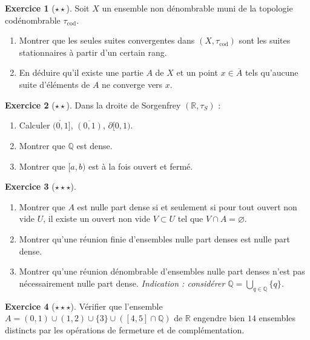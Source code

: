 \documentclass[12pt,a4paper,openany]{book}
\theoremstyle{definition}
\theoremstyle{cours}
\theoremstyle{coursnormal}
\newtheorem{exercice}{Exercice}[chapter]
\newcommand{\Q}{\mathbb{Q}}
\newcommand{\R}{\mathbb{R}}
\newcommand{\Int}[1]{\mathring{#1}}
\newcommand{\Cl}[1]{\overline{#1}}
\newcommand{\Fr}[1]{\partial #1}
\begin{document}
\begin{exercice}[$\star\star$]\label{exo:adherence-non-sequentielle}
  Soit $X$ un ensemble non dénombrable muni de la topologie codénombrable $\tau_{\mathrm{cod}}$.
  \begin{enumerate}[label=(\alph*)]
    \item Montrer que les seules suites convergentes dans $(X, \tau_{\mathrm{cod}})$ sont les suites stationnaires à partir d'un certain rang.
    \item En déduire qu'il existe une partie $A$ de $X$ et un point $x \in \Cl{A}$ tels qu'aucune suite d'éléments de $A$ ne converge vers $x$.
  \end{enumerate}
\end{exercice}

\begin{exercice}[$\star\star$]\label{exo:sorgenfrey-calculs}
  Dans la droite de Sorgenfrey $(\R, \tau_S)$ :
  \begin{enumerate}[label=(\alph*)]
    \item Calculer $\Int{(0,1]}$, $\Cl{(0,1)}$, $\Fr{[0,1)}$.
    \item Montrer que $\Q$ est dense.
    \item Montrer que $[a,b)$ est à la fois ouvert et fermé.
  \end{enumerate}
\end{exercice}

\begin{exercice}[$\star\star\star$]\label{exo:nulle-part-dense}
  \begin{enumerate}[label=(\alph*)]
    \item Montrer que $A$ est nulle part dense si et seulement si pour tout ouvert non vide $U$, il existe un ouvert non vide $V \subset U$ tel que $V \cap A = \varnothing$.
    \item Montrer qu'une réunion finie d'ensembles nulle part denses est nulle part dense.
    \item Montrer qu'une réunion dénombrable d'ensembles nulle part denses n'est pas nécessairement nulle part dense. \emph{Indication : considérer $\Q = \bigcup_{q \in \Q} \{q\}$.}
  \end{enumerate}
\end{exercice}

\begin{exercice}[$\star\star\star$]\label{exo:kuratowski-verification}
  Vérifier que l'ensemble $A = (0,1) \cup (1,2) \cup \{3\} \cup ([4,5] \cap \Q)$ de $\R$ engendre bien $14$ ensembles distincts par les opérations de fermeture et de complémentation.
\end{exercice}
\end{document}
